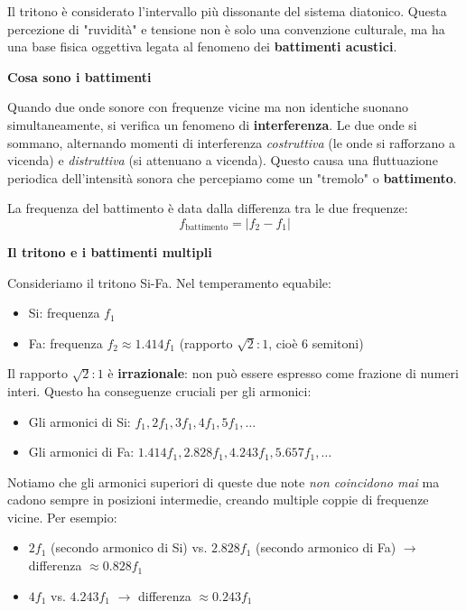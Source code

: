 \begin{fisica}
	\label{phys:battimenti_tritono}
	
	Il tritono è considerato l'intervallo più dissonante del sistema diatonico. Questa percezione di "ruvidità" e tensione non è solo una convenzione culturale, ma ha una base fisica oggettiva legata al fenomeno dei \textbf{battimenti acustici}.
	
	\textbf{Cosa sono i battimenti}
	
	Quando due onde sonore con frequenze vicine ma non identiche suonano simultaneamente, si verifica un fenomeno di \textbf{interferenza}. Le due onde si sommano, alternando momenti di interferenza \textit{costruttiva} (le onde si rafforzano a vicenda) e \textit{distruttiva} (si attenuano a vicenda). Questo causa una fluttuazione periodica dell'intensità sonora che percepiamo come un "tremolo" o \textbf{battimento}.
	
	La frequenza del battimento è data dalla differenza tra le due frequenze:
	\[
	f_{\text{battimento}} = |f_2 - f_1|
	\]
	
	\textbf{Il tritono e i battimenti multipli}
	
	Consideriamo il tritono Si-Fa. Nel temperamento equabile:
	\begin{itemize}
		\item Si: frequenza $f_1$
		\item Fa: frequenza $f_2 \approx 1.414 f_1$ (rapporto $\sqrt{2}:1$, cioè 6 semitoni)
	\end{itemize}
	
	Il rapporto $\sqrt{2}:1$ è \textbf{irrazionale}: non può essere espresso come frazione di numeri interi. Questo ha conseguenze cruciali per gli armonici:
	
	\begin{itemize}
		\item Gli armonici di Si: $f_1, 2f_1, 3f_1, 4f_1, 5f_1, \ldots$
		\item Gli armonici di Fa: $1.414f_1, 2.828f_1, 4.243f_1, 5.657f_1, \ldots$
	\end{itemize}
	
	Notiamo che gli armonici superiori di queste due note \textit{non coincidono mai} ma cadono sempre in posizioni intermedie, creando multiple coppie di frequenze vicine. Per esempio:
	\begin{itemize}
		\item $2f_1$ (secondo armonico di Si) vs. $2.828f_1$ (secondo armonico di Fa) $\rightarrow$ differenza $\approx 0.828f_1$
		\item $4f_1$ vs. $4.243f_1$ $\rightarrow$ differenza $\approx 0.243f_1$
	\end{itemize}
	

\end{fisica}
